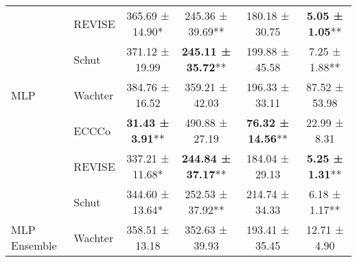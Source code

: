\begin{table}
{\begin{tabular}[t]{llcccc}
 & REVISE & 365.69 ± 14.90*\hphantom{*} & 245.36 ± 39.69** & 180.18 ± 30.75\hphantom{*}\hphantom{*} & \textbf{5.05 ± 1.05}**\\

 & Schut & 371.12 ± 19.99\hphantom{*}\hphantom{*} & \textbf{245.11 ± 35.72}** & 199.88 ± 45.58\hphantom{*}\hphantom{*} & 7.25 ± 1.88**\\

\multirow{-4}{*}{\raggedright\arraybackslash MLP} & Wachter & 384.76 ± 16.52\hphantom{*}\hphantom{*} & 359.21 ± 42.03\hphantom{*}\hphantom{*} & 196.33 ± 33.11\hphantom{*}\hphantom{*} & 87.52 ± 53.98\hphantom{*}\hphantom{*}\\
\cmidrule{1-6}
 & ECCCo & \textbf{31.43 ± 3.91}** & 490.88 ± 27.19\hphantom{*}\hphantom{*} & \textbf{76.32 ± 14.56}** & 22.99 ± 8.31\hphantom{*}\hphantom{*}\\

 & REVISE & 337.21 ± 11.68*\hphantom{*} & \textbf{244.84 ± 37.17}** & 184.04 ± 29.13\hphantom{*}\hphantom{*} & \textbf{5.25 ± 1.31}**\\

 & Schut & 344.60 ± 13.64*\hphantom{*} & 252.53 ± 37.92** & 214.74 ± 34.33\hphantom{*}\hphantom{*} & 6.18 ± 1.17**\\

\multirow{-4}{*}{\raggedright\arraybackslash MLP Ensemble} & Wachter & 358.51 ± 13.18\hphantom{*}\hphantom{*} & 352.63 ± 39.93\hphantom{*}\hphantom{*} & 193.41 ± 35.45\hphantom{*}\hphantom{*} & 12.71 ± 4.90\hphantom{*}\hphantom{*}\\
\bottomrule
\end{tabular}}
\end{table}
